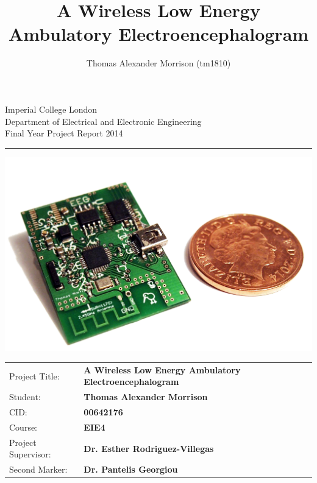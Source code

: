 \documentclass[]{article}
\title{A Wireless  Low Energy Ambulatory Electroencephalogram}
\author{Thomas Alexander Morrison (tm1810)}
\begin{document}
\begin{titlepage}
\setlength{\parindent}{0pt}
\setlength{\parskip}{0pt}

{
\Large
\raggedright
Imperial College London\\[17pt]
Department of Electrical and Electronic Engineering\\[17pt]
Final Year Project Report 2014\\[17pt]

}
\rule{\columnwidth}{3pt}

\vfill

\centering
 \includegraphics[width=0.9\columnwidth,keepaspectratio]{assets/front.png}

\vfill

\setlength{\tabcolsep}{0pt}
\begin{tabular}{p{40mm}p{\dimexpr\columnwidth-40mm}}
Project Title: & \textbf{A Wireless  Low Energy Ambulatory Electroencephalogram} \\[12pt]
Student: & \textbf{Thomas Alexander Morrison} \\[12pt]
CID: & \textbf{00642176} \\[12pt]
Course: & \textbf{EIE4} \\[12pt]
Project Supervisor: & \textbf{Dr. Esther Rodriguez-Villegas} \\[12pt]
Second Marker: & \textbf{Dr. Pantelis Georgiou} \\
\end{tabular}
\end{titlepage}

\clearpage





\clearpage
\end{document}
